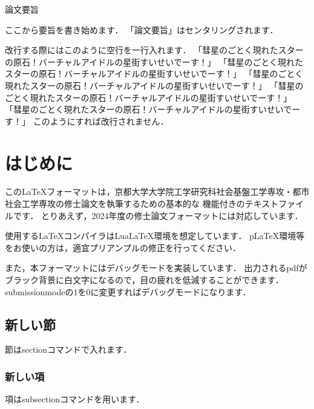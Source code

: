 \documentclass[a4paper, 11pt]{report}
\begin{document}
\begin{center}
    {\fontsize{12pt}{26pt}\selectfont \gtfamily 論文要旨} %
\end{center}
\par \indent
ここから要旨を書き始めます．
「論文要旨」はセンタリングされます．

改行する際にはこのように空行を一行入れます．
「彗星のごとく現れたスターの原石！バーチャルアイドルの星街すいせいでーす！」
「彗星のごとく現れたスターの原石！バーチャルアイドルの星街すいせいでーす！」
「彗星のごとく現れたスターの原石！バーチャルアイドルの星街すいせいでーす！」
「彗星のごとく現れたスターの原石！バーチャルアイドルの星街すいせいでーす！」
「彗星のごとく現れたスターの原石！バーチャルアイドルの星街すいせいでーす！」
このようにすれば改行されません．
\newpage

\tableofcontents
\newpage

\clearpage
{}

\chapter{はじめに}
この\LaTeX フォーマットは，京都大学大学院工学研究科社会基盤工学専攻・都市社会工学専攻の修士論文を執筆するための基本的な
機能付きのテキストファイルです．
とりあえず，2024年度の修士論文フォーマットには対応しています．

使用する\LaTeX コンパイラはLuaLaTeX環境を想定しています．
pLaTeX環境等をお使いの方は，適宜プリアンプルの修正を行ってください．

また，本フォーマットにはデバッグモードを実装しています．
出力されるpdfがブラック背景に白文字になるので，目の疲れを低減することができます．
submissionmodeの1を0に変更すればデバッグモードになります．

\section{新しい節}
節はsectionコマンドで入れます．

\subsection{新しい項}
項はsubsectionコマンドを用います．
\end{document}
